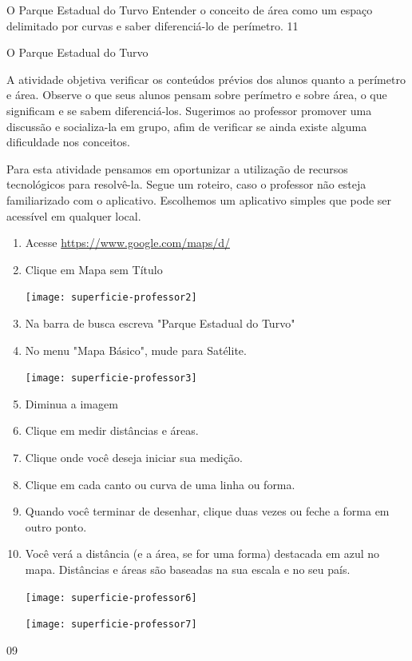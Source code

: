 \cleardoublepage
\def\currentcolor{session1}
\begin{objectives}{O Parque Estadual do Turvo}
{
Entender o conceito de área como um espaço delimitado por curvas e saber diferenciá-lo de perímetro.
}{1}{1}
\end{objectives}
\begin{sugestions}{O Parque Estadual do Turvo}{
A atividade objetiva verificar os conteúdos prévios dos alunos quanto a perímetro e área. Observe o que seus alunos pensam sobre perímetro e sobre área, o que significam e se sabem diferenciá-los. Sugerimos ao professor promover uma discussão e socializa-la em grupo, afim de verificar se ainda existe alguma dificuldade nos conceitos.

Para esta atividade pensamos em oportunizar a utilização de recursos tecnológicos para resolvê-la. Segue um roteiro, caso o professor não esteja familiarizado com o aplicativo. Escolhemos um aplicativo simples que pode ser acessível em qualquer local.



\begin{enumerate}
\item Acesse \url{https://www.google.com/maps/d/} 
\item Clique em Mapa sem Título

\texttt{[image: superficie-professor2]}
\item Na barra de busca escreva "Parque Estadual do Turvo"
\item No menu "Mapa Básico", mude para Satélite.


\texttt{[image: superficie-professor3]}


\item Diminua a imagem
\begin{figure}[H]
\centering

\end{figure}

\item Clique em medir distâncias e áreas.

\item Clique onde você deseja iniciar sua medição.
\item Clique em cada canto ou curva de uma linha ou forma.
\item Quando você terminar de desenhar, clique duas vezes ou feche a forma em outro ponto.
\item Você verá a distância (e a área, se for uma forma) destacada em azul no mapa. Distâncias e áreas são baseadas na sua escala e no seu país.

\centering
\texttt{[image: superficie-professor6]}

\texttt{[image: superficie-professor7]}

\end{enumerate}
}{0}{9}
\end{sugestions}

